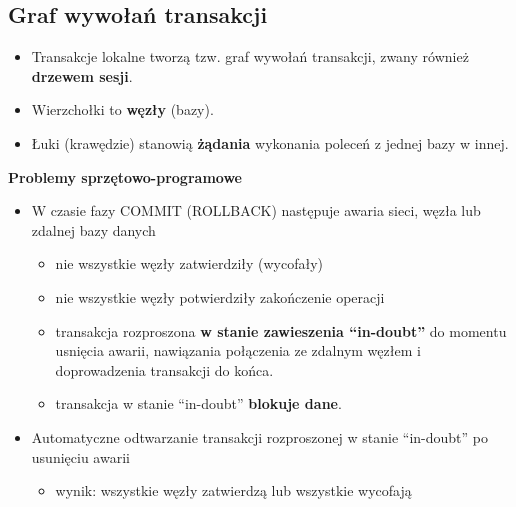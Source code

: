 \documentclass[a4paper]{article}
\begin{document}
    \subsection{Graf wywołań transakcji}
    \begin{itemize}
        \item Transakcje lokalne tworzą tzw. graf wywołań transakcji, zwany również \textbf{drzewem sesji}.
        \item Wierzchołki to \textbf{węzły} (bazy).
        \item Łuki (krawędzie) stanowią \textbf{żądania} wykonania poleceń z jednej bazy w innej.
    \end{itemize}

    \textbf{Problemy sprzętowo-programowe}
    \begin{itemize}
        \item W czasie fazy COMMIT (ROLLBACK) następuje awaria
        sieci, węzła lub zdalnej bazy danych
        \begin{itemize}
            \item nie wszystkie węzły zatwierdziły (wycofały)
            \item nie wszystkie węzły potwierdziły zakończenie operacji
            \item transakcja rozproszona \textbf{w stanie zawieszenia ``in-doubt''} do momentu usnięcia awarii, nawiązania połączenia ze zdalnym
            węzłem i doprowadzenia transakcji do końca.
            \item transakcja w stanie ``in-doubt'' \textbf{blokuje dane}.
        \end{itemize}
        \item Automatyczne odtwarzanie transakcji rozproszonej w stanie “in-doubt” po usunięciu awarii
        \begin{itemize}
            \item wynik: wszystkie węzły zatwierdzą lub wszystkie wycofają
        \end{itemize}
    \end{itemize}
\end{document}
